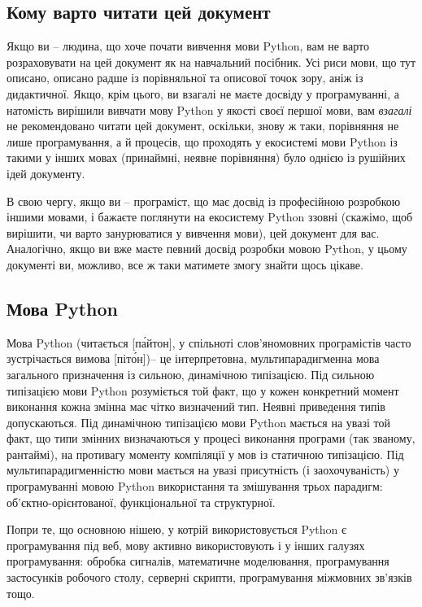 \documentclass[a4paper, 12pt, onsedie]{article}
\begin{document}
    \subsection{Кому варто читати цей документ}
    Якщо ви -- людина, що хоче почати вивчення мови Python, вам не варто розраховувати на цей документ як
    на навчальний посібник. Усі риси мови, що тут описано, описано радше із порівняльної та описової точок
    зору, аніж із дидактичної. Якщо, крім цього, ви взагалі не маєте досвіду у програмуванні, а натомість
    вирішили вивчати мову Python у якості своєї першої мови, вам \emph{взагалі} не рекомендовано читати цей
    документ, оскільки, знову ж таки, порівняння не лише програмування, а й процесів, що проходять у екосистемі
    мови Python із такими у інших мовах (принаймні, неявне порівняння) було однією із рушійних ідей документу.

    В свою чергу, якщо ви -- програміст, що має досвід із професійною розробкою іншими мовами, і бажаєте
    поглянути на екосистему Python ззовні (скажімо, щоб вирішити, чи варто занурюватися у вивчення мови),
    цей документ для вас. Аналогічно, якщо ви вже маєте певний досвід розробки мовою Python, у цьому документі
    ви, можливо, все ж таки матимете змогу знайти щось цікаве.

\subsection{Мова Python}

    Мова Python (читається [п\'{а}йтон], у спільноті слов'яномовних програмістів 
    часто зустрічається вимова [піт\'{о}н])-- 
    це інтерпретовна, мультипарадигменна мова загального призначення із сильною,
    динамічною типізацією. Під сильною типізацією мови Python розуміється той факт, що у кожен конкретний момент
    виконання кожна змінна має чітко визначений тип. Неявні приведення типів допускаються. Під динамічною типізацією
    мови Python мається на увазі той факт, що типи змінних визначаються у процесі виконання програми (так званому,
    рантаймі), на противагу моменту компіляції у мов із статичною типізацією. Під мультипарадигменністю мови мається
    на увазі присутність (і заохочуваність) у програмуванні мовою Python використання та змішування трьох парадигм:
    об'єктно-орієнтованої, функціональної та структурної.

    Попри те, що основною нішею, у котрій використовується Python є програмування під веб, мову активно використовують і
    у інших галузях програмування: обробка сигналів, математичне моделювання, програмування застосунків робочого
    столу, серверні скрипти, програмування міжмовних зв'язків тощо.
\end{document}
